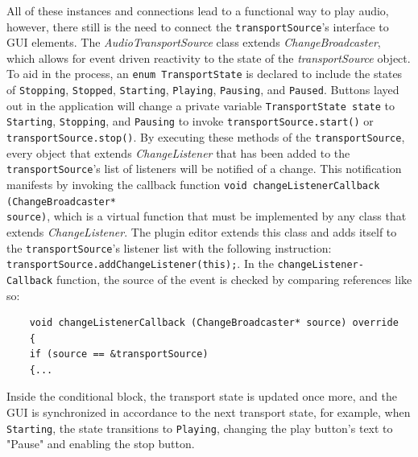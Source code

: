 \documentclass[12pt, a4paper, hidelinks]{article}
\begin{document}
	All of these instances and connections lead to a functional way to play audio, however, there still is the need to connect the \texttt{transportSource}'s interface to GUI elements. The \textit{AudioTransportSource} class extends \textit{ChangeBroadcaster}, which allows for event driven reactivity to the state of the \textit{transportSource} object. To aid in the process, an \texttt{enum TransportState} is declared to include the states of \texttt{Stopping}, \texttt{Stopped}, \texttt{Starting}, \texttt{Playing}, \texttt{Pausing}, and \texttt{Paused}. Buttons layed out in the application will change a private variable \texttt{TransportState state} to \texttt{Starting}, \texttt{Stopping}, and \texttt{Pausing} to invoke \texttt{transportSource.start()} or \texttt{transportSource.stop()}. By executing these methods of the \texttt{transportSource}, every object that extends \textit{ChangeListener} that has been added to the \texttt{transportSource}'s list of listeners will be notified of a change. This notification manifests by invoking the callback function \texttt{void changeListenerCallback (ChangeBroadcaster*\\ source)}, which is a virtual function that must be implemented by any class that extends \textit{ChangeListener}. The plugin editor extends this class and adds itself to the \texttt{transportSource}'s listener list with the following instruction: \texttt{transportSource.addChangeListener(this);}. In the \texttt{changeListener-\\
	Callback} function, the source of the event is checked by comparing references like so:
	\begin{verbatim}
	void changeListenerCallback (ChangeBroadcaster* source) override
	{
	if (source == &transportSource)
	{...
	\end{verbatim}
	Inside the conditional block, the transport state is updated once more, and the GUI is synchronized in accordance to the next transport state, for example, when \texttt{Starting}, the state transitions to \texttt{Playing}, changing the play button's text to "Pause" and enabling the stop button. \par
	
	
	\newpage
\end{document}
